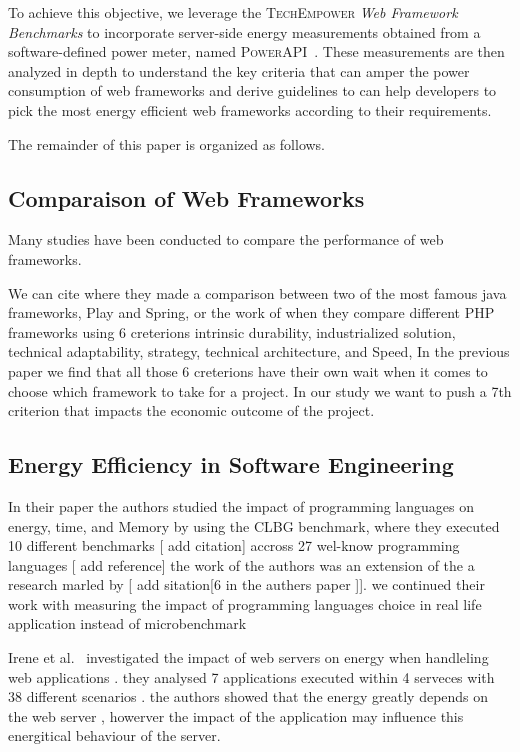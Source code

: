 To achieve this objective, we leverage the \textsc{TechEmpower} \emph{Web Framework Benchmarks} to incorporate server-side energy measurements obtained from a software-defined power meter, named \textsc{PowerAPI}~\cite{}.
These measurements are then analyzed in depth to understand the key criteria that can amper the power consumption of web frameworks and derive guidelines to can help developers to pick the most energy efficient web frameworks according to their requirements.

The remainder of this paper is organized as follows.

\subsection{Comparaison of Web Frameworks}

Many studies have been conducted to compare the performance of web frameworks.

We can cite \cite{gajewski_analysis_2019} where they made a comparison between two of the most famous java frameworks, Play and Spring, or the work of \cite{benmoussa_new_2019} when they compare different PHP frameworks using 6 creterions intrinsic durability, industrialized solution, technical adaptability, strategy, technical architecture, and Speed, In the previous paper we find that all those 6 creterions have their own wait when it comes to choose which framework to take for a project. In our study we want to push a 7th criterion that impacts the economic outcome of the project.


\subsection{Energy Efficiency in Software Engineering}

In their paper \cite{pereira_energy_2017} the authors studied the impact of programming languages on energy, time, and Memory by using the CLBG benchmark,
where they executed 10 different benchmarks [ add citation] accross 27 wel-know programming languages [ add reference]
the work of the authors was an extension of the a research marled by [ add sitation[6 in the authers paper ]]. we continued  their work  with measuring the impact of programming languages choice in real life application instead of microbenchmark


Irene et al.~\cite{manotas_investigating_2013} investigated the impact of web servers on energy when handleling web applications . they analysed 7 applications executed within 4 serveces with 38 different scenarios . the authors showed that the energy greatly depends on the web server , howerver the impact of the application may influence this energitical behaviour of the server.

